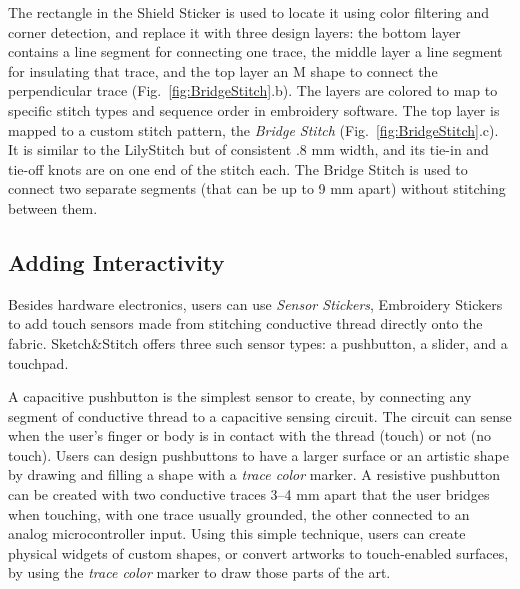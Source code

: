 \documentclass[header.tex]{subfiles}
\begin{document}
The rectangle in the Shield Sticker is used to locate it using color filtering and corner detection, and replace it with three design layers: the bottom layer contains a line segment for connecting one trace, the middle layer a line segment for insulating that trace, and the top layer an M shape to connect the perpendicular trace (Fig.\ \ref{fig:BridgeStitch}.b). The layers are colored to map to specific stitch types and sequence order in embroidery software. The top layer is mapped to a custom stitch pattern, the \textit{Bridge Stitch} (Fig.\ \ref{fig:BridgeStitch}.c). It is similar to the LilyStitch but of consistent .8 mm width, and its tie-in and tie-off knots are on one end of the stitch each. The Bridge Stitch is used to connect two separate segments (that can be up to 9 mm apart) without stitching between them.







\subsection{Adding Interactivity}
Besides hardware electronics, users can use \textit{Sensor Stickers}, Embroidery Stickers to add touch sensors made from stitching conductive thread directly onto the fabric. Sketch\&Stitch offers three such sensor types: a pushbutton, a slider, and a touchpad.

A capacitive pushbutton is the simplest sensor to create, by connecting any segment of conductive thread to a capacitive sensing circuit. The circuit can sense when the user's finger or body is in contact with the thread (touch) or not (no touch). Users can design pushbuttons to have a larger surface or an artistic shape by drawing and filling a shape with a \textit{trace color} marker. A resistive pushbutton can be created with two conductive traces 3--4 mm apart that the user bridges when touching, with one trace usually grounded, the other connected to an analog microcontroller input. Using this simple technique, users can create physical widgets of custom shapes, or convert artworks to touch-enabled surfaces, by using the \textit{trace color} marker to draw those parts of the art.
\end{document}
